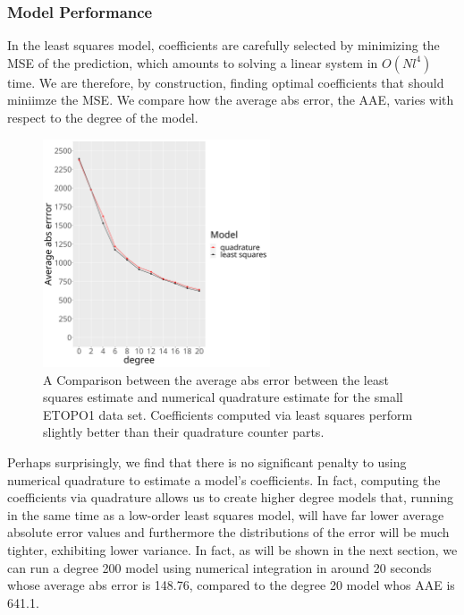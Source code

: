\documentclass[a4paper]{article}
\theoremstyle{definition}
\begin{document}
\newpage
\subsubsection{Model Performance}

In the least squares model, coefficients are carefully selected by minimizing the MSE of the prediction, which amounts to solving a linear system in $O(Nl^4)$ time. We are therefore,
by construction, finding optimal coefficients that should miniimze the MSE. We compare how the average abs error, the AAE, varies with
respect to the degree of the model.


\begin{figure}[h!]
    \centering
    \includegraphics[width=0.6\textwidth]{media/diff_error.png}
    \caption{A Comparison between the average abs error between the least squares estimate and numerical quadrature estimate for the small ETOPO1 data set. Coefficients computed via least squares
    perform slightly better than their quadrature counter parts.}
    \label{fig:error}
\end{figure}

Perhaps surprisingly, we find that there is no significant penalty to using numerical quadrature to estimate a model's coefficients. In fact, computing the coefficients via quadrature allows us to 
create higher degree models that, running in the same time as a low-order least squares model, will have far lower average absolute error values and furthermore the distributions of the error will be
much tighter, exhibiting lower variance. In fact, as will be shown in the next section, we can run a degree 200 model using numerical integration in around 20 seconds whose average abs error
is 148.76, compared to the degree 20 model whos AAE is 641.1.
\end{document}
